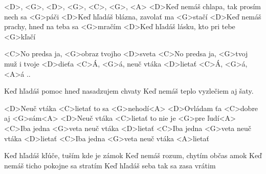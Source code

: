 

<D>, <G>, <D>, <G>, <C>, <G>, <A> <D>Keď nemáš chlapa, tak prosím nech sa <G>páči
<D>Keď hľadáš blázna, zavolať ma <G>stačí
<D>Keď nemáš prachy, hneď na teba sa <G>mračím
<D>Keď hľadáš lásku, kto pri tebe <G>kľačí
\ks

\zr
<C>No predsa ja, <G>obraz tvojho <D>sveta
<C>No predsa ja, <G>tvoj muž i tvoje <D>dieťa
<C>Á, <G>á, neuč vtáka <D>lietať
<C>Á, <G>á, <A>á ..
\kr

\zs
Keď hľadáš pomoc hneď nasadzujem chvaty
Keď nemáš teplo vyzlečiem aj šaty.
\ks

\zr
<D>Neuč vtáka <C>lietať to sa <G>nehodí<A> 
<D>Ovládam ťa <C>dobre aj <G>sám<A>
<D>Neuč vtáka <C>lietať to nie je <G>pre ľudí<A> 
<C>Iba jedna <G>veta neuč vtáka <D>lietať
<C>Iba jedna <G>veta neuč vtáka <D>lietať
<C>Iba jedna <G>veta neuč vtáka <A>lietať
\kr

\zs
Keď hľadáš kľúče, tuším kde je zámok
Keď nemáš rozum, chytím občas amok
Keď nemáš ticho pokojne sa stratím
Keď hľadáš seba tak sa zasa vrátim
\ks

\zr \kr

\kp

